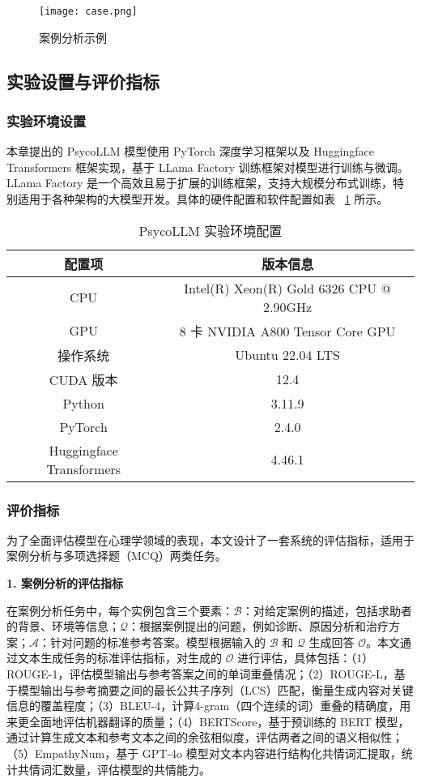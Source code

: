 \begin{figure}[ht]
  \centering
  \texttt{[image: case.png]}
  \caption{案例分析示例}
  \label{fig:case}
\end{figure}

\subsection{实验设置与评价指标}

\subsubsection{实验环境设置}

本章提出的 PsycoLLM 模型使用 PyTorch 深度学习框架以及 Huggingface Transformers 框架实现，基于 LLama Factory 训练框架对模型进行训练与微调。LLama Factory 是一个高效且易于扩展的训练框架，支持大规模分布式训练，特别适用于各种架构的大模型开发。具体的硬件配置和软件配置如表 ~\ref{tab:work1-实验环境配置} 所示。

\begin{table}
  \centering
  \caption{PsycoLLM 实验环境配置}
  \label{tab:work1-实验环境配置}
  \begin{tabular}{cc}
    \toprule
    配置项 & 版本信息 \\
    \midrule
    CPU & Intel(R) Xeon(R) Gold 6326 CPU @ 2.90GHz \\
    GPU & 8 卡 NVIDIA A800 Tensor Core GPU \\
    操作系统 & Ubuntu 22.04 LTS \\
    CUDA 版本 & 12.4 \\
    Python & 3.11.9 \\
    PyTorch & 2.4.0 \\
    Huggingface Transformers & 4.46.1 \\
    \bottomrule
  \end{tabular}
\end{table}

\subsubsection{评价指标}

为了全面评估模型在心理学领域的表现，本文设计了一套系统的评估指标，适用于案例分析与多项选择题（MCQ）两类任务。

\textbf{1. 案例分析的评估指标}

在案例分析任务中，每个实例包含三个要素：$\mathcal{B}$：对给定案例的描述，包括求助者的背景、环境等信息；$\mathcal{Q}$：根据案例提出的问题，例如诊断、原因分析和治疗方案；$\mathcal{A}$：针对问题的标准参考答案。模型根据输入的 $\mathcal{B}$ 和 $\mathcal{Q}$ 生成回答 $\mathcal{O}$。本文通过文本生成任务的标准评估指标，对生成的 $\mathcal{O}$ 进行评估，具体包括：（1）ROUGE-1，评估模型输出与参考答案之间的单词重叠情况；（2）ROUGE-L，基于模型输出与参考摘要之间的最长公共子序列（LCS）匹配，衡量生成内容对关键信息的覆盖程度；（3）BLEU-4，计算4-gram（四个连续的词）重叠的精确度，用来更全面地评估机器翻译的质量；（4）BERTScore，基于预训练的 BERT 模型，通过计算生成文本和参考文本之间的余弦相似度，评估两者之间的语义相似性；（5）EmpathyNum，基于 GPT-4o 模型对文本内容进行结构化共情词汇提取，统计共情词汇数量，评估模型的共情能力。

